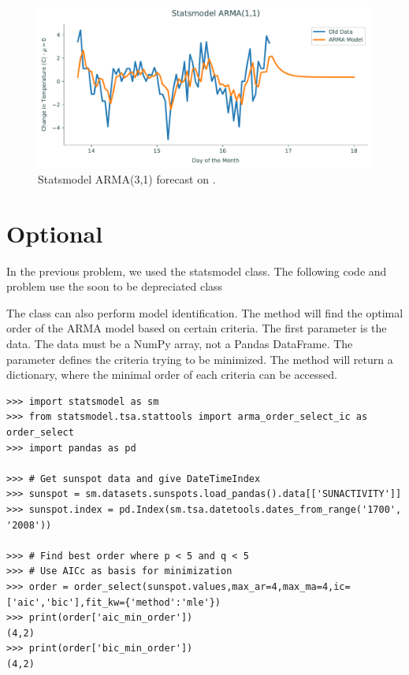 \begin{figure}[H]
\centering
\includegraphics[width=\textwidth]{figures/sm.pdf}
\caption{Statsmodel ARMA(3,1) forecast on .}
\label{fig:sm}
\end{figure}


\section*{Optional}
In the previous problem, we used the statsmodel  class. 
The following code and problem use the soon to be depreciated  class

The  class can also perform model identification.
The method  will find the optimal order of the ARMA model based on certain criteria.
The first parameter  is the data.
The data must be a NumPy array, not a Pandas DataFrame.
The parameter  defines the criteria trying to be minimized.
The method will return a dictionary, where the minimal order of each criteria can be accessed.

\begin{lstlisting}
>>> import statsmodel as sm
>>> from statsmodel.tsa.stattools import arma_order_select_ic as order_select
>>> import pandas as pd

>>> # Get sunspot data and give DateTimeIndex
>>> sunspot = sm.datasets.sunspots.load_pandas().data[['SUNACTIVITY']]
>>> sunspot.index = pd.Index(sm.tsa.datetools.dates_from_range('1700', '2008'))

>>> # Find best order where p < 5 and q < 5
>>> # Use AICc as basis for minimization
>>> order = order_select(sunspot.values,max_ar=4,max_ma=4,ic=['aic','bic'],fit_kw={'method':'mle'})
>>> print(order['aic_min_order'])
(4,2)
>>> print(order['bic_min_order'])
(4,2)
\end{lstlisting}

